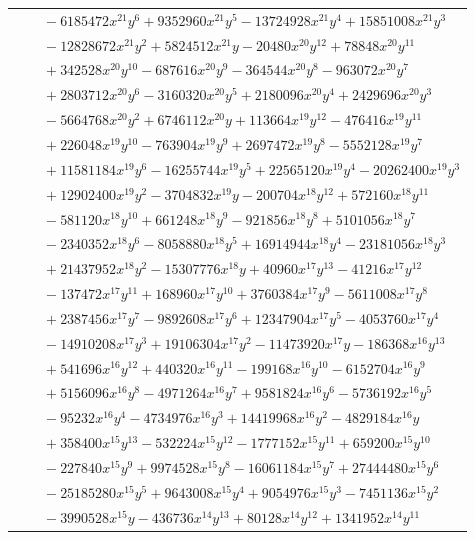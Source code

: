 \documentclass[11pt]{article}
\begin{document}
\begin{longtable}{@{}ll@{}}
 & $\quad -6185472x^{21}y^{6}+9352960x^{21}y^{5}-13724928x^{21}y^{4}+15851008x^{21}y^{3}$\\
 & $\quad -12828672x^{21}y^{2}+5824512x^{21}y-20480x^{20}y^{12}+78848x^{20}y^{11}$\\
 & $\quad +342528x^{20}y^{10}-687616x^{20}y^{9}-364544x^{20}y^{8}-963072x^{20}y^{7}$\\
 & $\quad +2803712x^{20}y^{6}-3160320x^{20}y^{5}+2180096x^{20}y^{4}+2429696x^{20}y^{3}$\\
 & $\quad -5664768x^{20}y^{2}+6746112x^{20}y+113664x^{19}y^{12}-476416x^{19}y^{11}$\\
 & $\quad +226048x^{19}y^{10}-763904x^{19}y^{9}+2697472x^{19}y^{8}-5552128x^{19}y^{7}$\\
 & $\quad +11581184x^{19}y^{6}-16255744x^{19}y^{5}+22565120x^{19}y^{4}-20262400x^{19}y^{3}$\\
 & $\quad +12902400x^{19}y^{2}-3704832x^{19}y-200704x^{18}y^{12}+572160x^{18}y^{11}$\\
 & $\quad -581120x^{18}y^{10}+661248x^{18}y^{9}-921856x^{18}y^{8}+5101056x^{18}y^{7}$\\
 & $\quad -2340352x^{18}y^{6}-8058880x^{18}y^{5}+16914944x^{18}y^{4}-23181056x^{18}y^{3}$\\
 & $\quad +21437952x^{18}y^{2}-15307776x^{18}y+40960x^{17}y^{13}-41216x^{17}y^{12}$\\
 & $\quad -137472x^{17}y^{11}+168960x^{17}y^{10}+3760384x^{17}y^{9}-5611008x^{17}y^{8}$\\
 & $\quad +2387456x^{17}y^{7}-9892608x^{17}y^{6}+12347904x^{17}y^{5}-4053760x^{17}y^{4}$\\
 & $\quad -14910208x^{17}y^{3}+19106304x^{17}y^{2}-11473920x^{17}y-186368x^{16}y^{13}$\\
 & $\quad +541696x^{16}y^{12}+440320x^{16}y^{11}-199168x^{16}y^{10}-6152704x^{16}y^{9}$\\
 & $\quad +5156096x^{16}y^{8}-4971264x^{16}y^{7}+9581824x^{16}y^{6}-5736192x^{16}y^{5}$\\
 & $\quad -95232x^{16}y^{4}-4734976x^{16}y^{3}+14419968x^{16}y^{2}-4829184x^{16}y$\\
 & $\quad +358400x^{15}y^{13}-532224x^{15}y^{12}-1777152x^{15}y^{11}+659200x^{15}y^{10}$\\
 & $\quad -227840x^{15}y^{9}+9974528x^{15}y^{8}-16061184x^{15}y^{7}+27444480x^{15}y^{6}$\\
 & $\quad -25185280x^{15}y^{5}+9643008x^{15}y^{4}+9054976x^{15}y^{3}-7451136x^{15}y^{2}$\\
 & $\quad -3990528x^{15}y-436736x^{14}y^{13}+80128x^{14}y^{12}+1341952x^{14}y^{11}$\\

\end{longtable}
\end{document}
